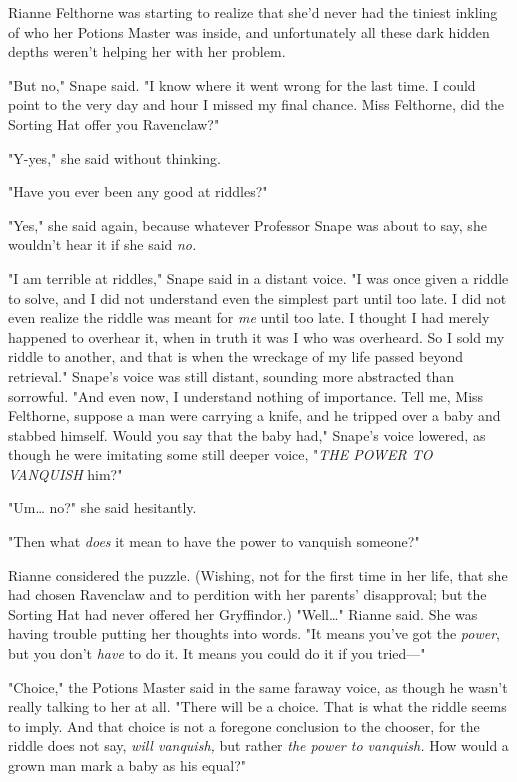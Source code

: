 Rianne Felthorne was starting to realize that she'd never had the tiniest 
inkling of who her Potions Master was inside, and unfortunately all these dark 
hidden depths weren't helping her with her problem.

"But no," Snape said. "I know where it went wrong for the last time. I could 
point to the very day and hour I missed my final chance. Miss Felthorne, did 
the Sorting Hat offer you Ravenclaw?"

"Y-yes," she said without thinking.

"Have you ever been any good at riddles?"

"Yes," she said again, because whatever Professor Snape was about to say, she 
wouldn't hear it if she said \emph{no.}

"I am terrible at riddles," Snape said in a distant voice. "I was once given a 
riddle to solve, and I did not understand even the simplest part until too 
late. I did not even realize the riddle was meant for \emph{me} until too late. 
I thought I had merely happened to overhear it, when in truth it was I who was 
overheard. So I sold my riddle to another, and that is when the wreckage of my 
life passed beyond retrieval." Snape's voice was still distant, sounding more 
abstracted than sorrowful. "And even now, I understand nothing of importance. 
Tell me, Miss Felthorne, suppose a man were carrying a knife, and he tripped 
over a baby and stabbed himself. Would you say that the baby had," Snape's 
voice lowered, as though he were imitating some still deeper voice, "\emph{THE 
POWER TO VANQUISH} him?"

"Um{\ldots} no?" she said hesitantly.

"Then what \emph{does} it mean to have the power to vanquish someone?"

Rianne considered the puzzle. (Wishing, not for the first time in her life, 
that she had chosen Ravenclaw and to perdition with her parents' disapproval; 
but the Sorting Hat had never offered her Gryffindor.) "Well{\ldots}" Rianne 
said. She was having trouble putting her thoughts into words. "It means you've 
got the \emph{power}, but you don't \emph{have} to do it. It means you could do 
it if you tried---"

"Choice," the Potions Master said in the same faraway voice, as though he 
wasn't really talking to her at all. "There will be a choice. That is what the 
riddle seems to imply. And that choice is not a foregone conclusion to the 
chooser, for the riddle does not say, \emph{will vanquish,} but rather 
\emph{the power to vanquish.} How would a grown man mark a baby as his equal?"

